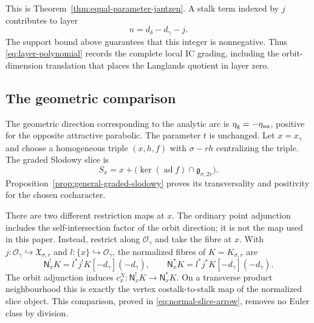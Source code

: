 \documentclass[11pt]{amsart}
\theoremstyle{definition}
\theoremstyle{remark}
\begin{document}
This is Theorem~\ref{thm:equal-parameter-jantzen}.  A stalk term indexed by
$j$ contributes to layer
\[
 n=d_\delta-d_\gamma-j.
\]
The support bound above guarantees that this integer is nonnegative.  Thus
\eqref{eq:layer-polynomial} records the complete local IC grading,
including the orbit-dimension translation that places the Langlands quotient
in layer zero.

\subsection*{The geometric comparison}

The geometric direction corresponding to the analytic arc is
$\eta_{\rm g}=-\eta_{\rm an}$, positive for the opposite attractive
parabolic.  The parameter $t$ is unchanged.  Let $x=x_\gamma$ and choose
a homogeneous triple $(x,h,f)$ with $\sigma-rh$ centralizing the triple.
The graded Slodowy slice is
\[
 S_x=x+\bigl(\ker(\operatorname{ad}f)\cap\mathfrak g_{\sigma,2r}\bigr).
\]
Proposition~\ref{prop:general-graded-slodowy} proves its transversality
and positivity for the chosen cocharacter.

There are two different restriction maps at $x$.  The ordinary point
adjunction includes the self-intersection factor of the orbit direction;
it is not the map used in this paper.  Instead, restrict along
$\mathcal O_\gamma$ and take the fibre at $x$.  With $j:\mathcal O_\gamma
\hookrightarrow\mathfrak X_{\sigma,r}$ and $l:\{x\}\hookrightarrow
\mathcal O_\gamma$, the normalized fibres of $K=K_{\sigma,r}$ are
\[
 \mathsf N_x^!K=l^*j^!K[-d_\gamma](-d_\gamma),\qquad
 \mathsf N_x^*K=l^*j^*K[-d_\gamma](-d_\gamma).
\]
The orbit adjunction induces $c_x^N:\mathsf N_x^!K\to\mathsf N_x^*K$.
On a transverse product neighbourhood this is exactly the vertex
costalk-to-stalk map of the normalized slice object.  This comparison,
proved in \eqref{eq:normal-slice-arrow}, removes no Euler class by
division.
\end{document}
